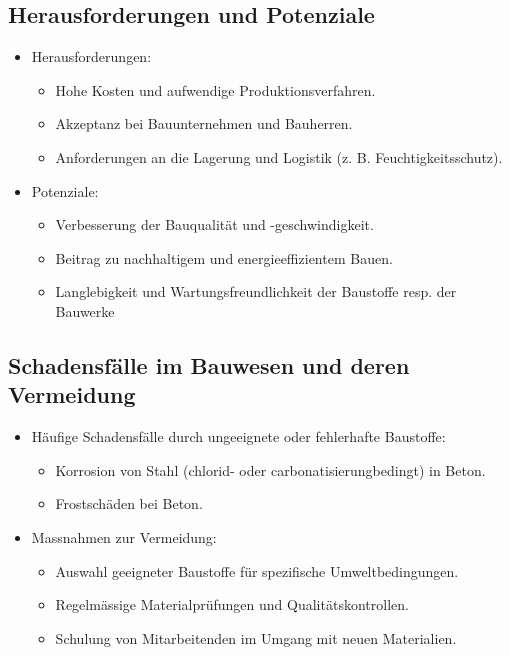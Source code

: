 \documentclass[
11pt,
captions=tableheading,
smallheadings,
headsepline,
footsepline, 
captions=tableheading,
parskip=half-,
]{scrartcl}
\begin{document}
\subsection{Herausforderungen und Potenziale}
\begin{itemize}
    \item Herausforderungen:
    \begin{itemize}
        \item Hohe Kosten und aufwendige Produktionsverfahren.
        \item Akzeptanz bei Bauunternehmen und Bauherren.
        \item Anforderungen an die Lagerung und Logistik (z. B. Feuchtigkeitsschutz).
    \end{itemize}
    \item Potenziale:
    \begin{itemize}
        \item Verbesserung der Bauqualität und -geschwindigkeit.
        \item Beitrag zu nachhaltigem und energieeffizientem Bauen.
        \item Langlebigkeit und Wartungsfreundlichkeit der Baustoffe resp. der Bauwerke
    \end{itemize}
\end{itemize}

\subsection{Schadensfälle im Bauwesen und deren Vermeidung}
\begin{itemize}
    \item Häufige Schadensfälle durch ungeeignete oder fehlerhafte Baustoffe:
    \begin{itemize}
        \item Korrosion von Stahl  (chlorid- oder carbonatisierungbedingt) in Beton.
        \item Frostschäden bei Beton.
    \end{itemize}
    \item Massnahmen zur Vermeidung:
    \begin{itemize}
        \item Auswahl geeigneter Baustoffe für spezifische Umweltbedingungen.
        \item Regelmässige Materialprüfungen und Qualitätskontrollen.
        \item Schulung von Mitarbeitenden im Umgang mit neuen Materialien.
    \end{itemize}
\end{itemize}
\end{document}
